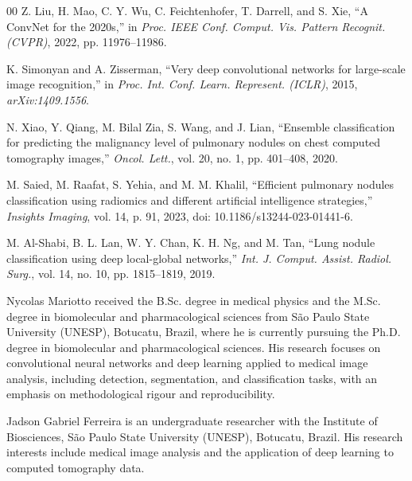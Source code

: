 \documentclass{ieeeaccess}
\begin{document}
\begin{thebibliography}{00}
 Z. Liu, H. Mao, C. Y. Wu, C. Feichtenhofer, T. Darrell, and S. Xie, ``A ConvNet for the 2020s,'' in \textit{Proc. IEEE Conf. Comput. Vis. Pattern Recognit. (CVPR)}, 2022, pp. 11976--11986.

 K. Simonyan and A. Zisserman, ``Very deep convolutional networks for large-scale image recognition,'' in \textit{Proc. Int. Conf. Learn. Represent. (ICLR)}, 2015, \textit{arXiv:1409.1556}.

 N. Xiao, Y. Qiang, M. Bilal Zia, S. Wang, and J. Lian, ``Ensemble classification for predicting the malignancy level of pulmonary nodules on chest computed tomography images,'' \textit{Oncol. Lett.}, vol. 20, no. 1, pp. 401--408, 2020.

 M. Saied, M. Raafat, S. Yehia, and M. M. Khalil, ``Efficient pulmonary nodules classification using radiomics and different artificial intelligence strategies,'' \textit{Insights Imaging}, vol. 14, p. 91, 2023, doi: 10.1186/s13244-023-01441-6.

 M. Al-Shabi, B. L. Lan, W. Y. Chan, K. H. Ng, and M. Tan, ``Lung nodule classification using deep local-global networks,'' \textit{Int. J. Comput. Assist. Radiol. Surg.}, vol. 14, no. 10, pp. 1815--1819, 2019.

\end{thebibliography}

\begin{IEEEbiographynophoto}{Nycolas Mariotto}
received the B.Sc. degree in medical physics and the M.Sc. degree in biomolecular and pharmacological sciences from S\~ao Paulo State University (UNESP), Botucatu, Brazil, where he is currently pursuing the Ph.D. degree in biomolecular and pharmacological sciences. His research focuses on convolutional neural networks and deep learning applied to medical image analysis, including detection, segmentation, and classification tasks, with an emphasis on methodological rigour and reproducibility.
\end{IEEEbiographynophoto}

\begin{IEEEbiographynophoto}{Jadson Gabriel Ferreira}
is an undergraduate researcher with the Institute of Biosciences, S\~ao Paulo State University (UNESP), Botucatu, Brazil. His research interests include medical image analysis and the application of deep learning to computed tomography data.
\end{IEEEbiographynophoto}
\end{document}

